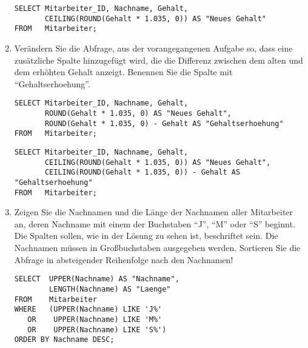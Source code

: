 \begin{enumerate}
        \begin{mssql}[\FALSE]
        \end{mssql}
        \begin{lstlisting}[language=ms_sql]
SELECT Mitarbeiter_ID, Nachname, Gehalt,
       CEILING(ROUND(Gehalt * 1.035, 0)) AS "Neues Gehalt"
FROM   Mitarbeiter;
        \end{lstlisting}
        \item Verändern Sie die Abfrage, aus der vorangegangenen Aufgabe so,
        dass eine zusätzliche Spalte hinzugefügt wird, die die Differenz
        zwischen dem alten und dem erhöhten Gehalt anzeigt. Benennen Sie die
        Spalte mit \enquote{Gehaltserhoehung}.
        \begin{oraclesql}[\FALSE]
        \end{oraclesql}
        \begin{lstlisting}[language=oracle_sql]
SELECT Mitarbeiter_ID, Nachname, Gehalt,
       ROUND(Gehalt * 1.035, 0) AS "Neues Gehalt",
       ROUND(Gehalt * 1.035, 0) - Gehalt AS "Gehaltserhoehung"
FROM   Mitarbeiter;
        \end{lstlisting}
        \begin{mssql}[\FALSE]
        \end{mssql}
        \begin{lstlisting}[language=ms_sql]
SELECT Mitarbeiter_ID, Nachname, Gehalt,
       CEILING(ROUND(Gehalt * 1.035, 0)) AS "Neues Gehalt",
       CEILING(ROUND(Gehalt * 1.035, 0)) - Gehalt AS "Gehaltserhoehung"
FROM   Mitarbeiter;
        \end{lstlisting}
        \item Zeigen Sie die Nachnamen und die Länge der Nachnamen aller
        Mitarbeiter an, deren Nachname mit einem der Buchstaben \enquote{J},
        \enquote{M} oder \enquote{S} beginnt. Die Spalten sollen, wie in der
        Lösung zu sehen ist, beschriftet sein. Die Nachnamen müssen in
        Großbuchstaben ausgegeben werden. Sortieren Sie die Abfrage in
        absteigender Reihenfolge nach den Nachnamen! 
        \begin{oraclesql}[\FALSE]
        \end{oraclesql}
        \begin{lstlisting}[language=oracle_sql]
SELECT  UPPER(Nachname) AS "Nachname",
        LENGTH(Nachname) AS "Laenge"
FROM    Mitarbeiter
WHERE   (UPPER(Nachname) LIKE 'J%'
   OR    UPPER(Nachname) LIKE 'M%'
   OR    UPPER(Nachname) LIKE 'S%')
ORDER BY Nachname DESC;
        \end{lstlisting}

\end{enumerate}
